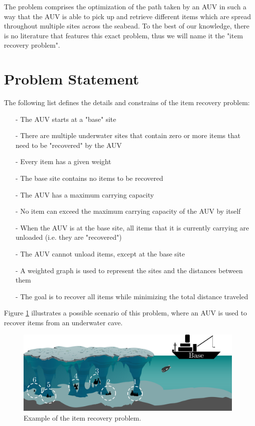 \documentclass[conference]{IEEEtran}
\begin{document}
The problem comprises the optimization of the path taken by an AUV in such a way that the AUV is able to pick up and retrieve different items which are spread throughout multiple sites across the seabead. To the best of our knowledge, there is no literature that features this exact problem, thus we will name it the "item recovery problem".

\section{Problem Statement}

The following list defines the details and constrains of the item recovery problem:

\begin{itemize}
    \item[-] The AUV starts at a "base" site
    \item[-] There are multiple underwater sites that contain zero or more items that need to be "recovered" by the AUV
    \item[-] Every item has a given weight
    \item[-] The base site contains no items to be recovered
    \item[-] The AUV has a maximum carrying capacity
    \item[-] No item can exceed the maximum carrying capacity of the AUV by itself
    \item[-] When the AUV is at the base site, all items that it is currently carrying are unloaded (i.e. they are "recovered")
    \item[-] The AUV cannot unload items, except at the base site
    \item[-] A weighted graph is used to represent the sites and the distances between them
    \item[-] The goal is to recover all items while minimizing the total distance traveled
\end{itemize}

Figure \ref{fig:cave} illustrates a possible scenario of this problem, where an AUV is used to recover items from an underwater cave.

\begin{figure}[H]
  	  \centering
      \includegraphics[width=\columnwidth]{./Figures/cave.png}
      \caption{Example of the item recovery problem.} 
      \label{fig:cave}
\end{figure}
\end{document}
